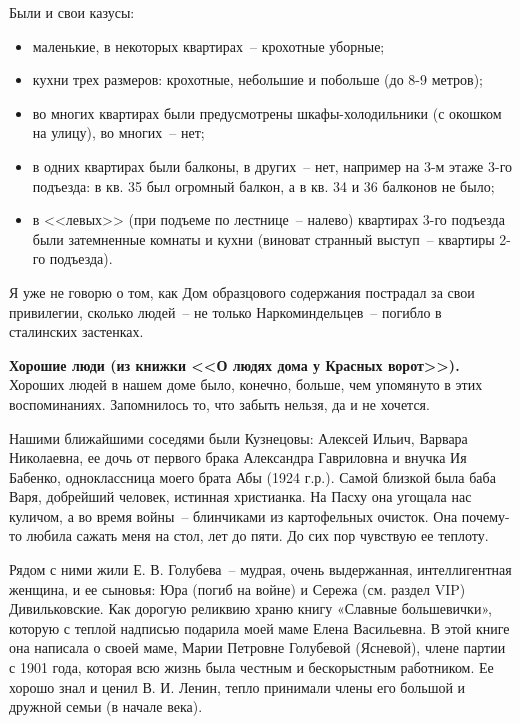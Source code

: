 Были и свои казусы:
\begin{itemize}
\item маленькие, в некоторых квартирах~-- крохотные уборные;
\item кухни трех размеров: крохотные, небольшие и побольше (до 8-9 метров);
\item во многих квартирах были предусмотрены шкафы-холодильники (с окошком на улицу), во многих~-- нет;
\item в одних квартирах были балконы, в других~-- нет, например на 3-м этаже 3-го подъезда: в кв. 35 был огромный балкон, а в кв. 34 и 36 балконов не было;
\item в <<левых>> (при подъеме по лестнице~-- налево) квартирах 3-го подъезда были затемненные комнаты и кухни (виноват странный выступ~-- квартиры 2-го подъезда). 
\end{itemize}

Я уже не говорю о том, как Дом образцового содержания пострадал за свои привилегии, сколько людей~-- не только Наркоминдельцев~-- погибло в сталинских застенках.

\indent

\textbf{Хорошие люди (из книжки <<О людях дома у Красных ворот>>).} Хороших людей в нашем доме было, конечно, больше, чем упомянуто в этих воспоминаниях. Запомнилось то, что забыть нельзя, да и не хочется.

\indent

Нашими ближайшими соседями были Кузнецовы: Алексей Ильич, Варвара Николаевна, ее дочь от первого брака Александра Гавриловна и внучка Ия Бабенко, одноклассница моего брата Абы (1924 г.р.). Самой близкой была баба Варя, добрейший человек, истинная христианка. На Пасху она угощала нас куличом, а во время войны~-- блинчиками из картофельных очисток. Она почему-то любила сажать меня на стол, лет до пяти. До сих пор чувствую ее теплоту.

\indent
Рядом с ними жили Е. В. Голубева~-- мудрая, очень выдержанная, интеллигентная женщина, и ее сыновья: Юра (погиб на войне) и Сережа (см. раздел VIP) Дивильковские. Как дорогую реликвию храню книгу «Славные большевички», которую с теплой надписью подарила моей маме Елена Васильевна. В этой книге она написала о своей маме, Марии Петровне Голубевой (Ясневой), члене партии с 1901 года, которая всю жизнь была честным и бескорыстным работником. Ее хорошо знал и ценил В. И. Ленин, тепло принимали члены его большой и дружной семьи (в начале века).

\indent


